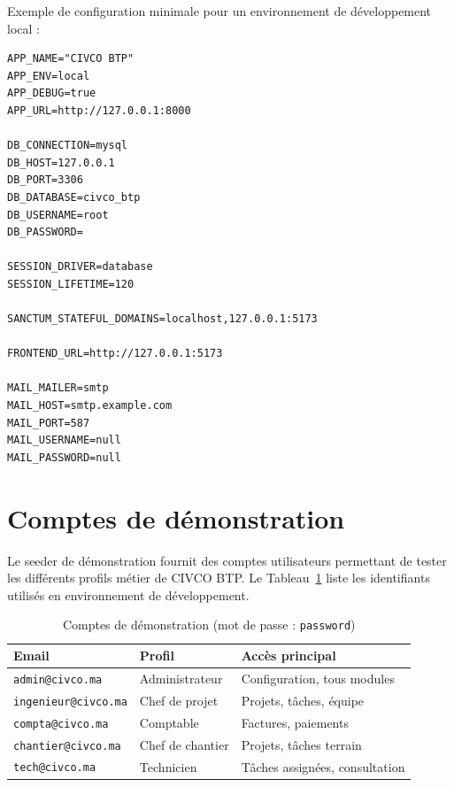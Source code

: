 \medskip

Exemple de configuration minimale pour un environnement de développement local :


\begin{lstlisting}[caption={.env : configuration de développement (extrait)}]
APP_NAME="CIVCO BTP"
APP_ENV=local
APP_DEBUG=true
APP_URL=http://127.0.0.1:8000

DB_CONNECTION=mysql
DB_HOST=127.0.0.1
DB_PORT=3306
DB_DATABASE=civco_btp
DB_USERNAME=root
DB_PASSWORD=

SESSION_DRIVER=database
SESSION_LIFETIME=120

SANCTUM_STATEFUL_DOMAINS=localhost,127.0.0.1:5173

FRONTEND_URL=http://127.0.0.1:5173

MAIL_MAILER=smtp
MAIL_HOST=smtp.example.com
MAIL_PORT=587
MAIL_USERNAME=null
MAIL_PASSWORD=null
\end{lstlisting}

\section{Comptes de démonstration}

Le seeder de démonstration fournit des comptes utilisateurs permettant de
tester les différents profils métier de CIVCO BTP. Le Tableau~\ref{tab:demo_users}
liste les identifiants utilisés en environnement de développement.

\begin{table}[H]
\caption{Comptes de démonstration (mot de passe : \texttt{password})}
\label{tab:demo_users}
\centering
\small
\begin{tabular}{|l|l|p{5.5cm}|}
\hline
\textbf{Email} & \textbf{Profil} & \textbf{Accès principal} \\
\hline
\texttt{admin@civco.ma} & Administrateur & Configuration, tous modules \\
\hline
\texttt{ingenieur@civco.ma} & Chef de projet & Projets, tâches, équipe \\
\hline
\texttt{compta@civco.ma} & Comptable & Factures, paiements \\
\hline
\texttt{chantier@civco.ma} & Chef de chantier & Projets, tâches terrain \\
\hline
\texttt{tech@civco.ma} & Technicien & Tâches assignées, consultation \\
\hline
\end{tabular}
\end{table}

